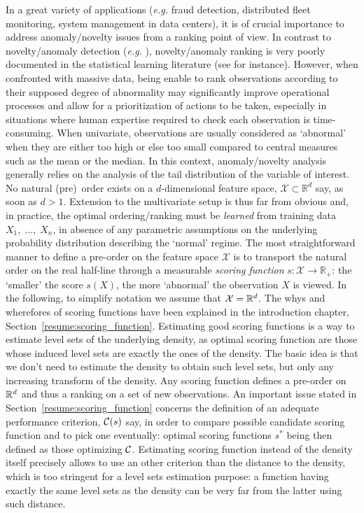 In a great variety of applications  (\textit{e.g.} fraud detection, distributed fleet monitoring, system management in data centers), it is of crucial importance to address anomaly/novelty issues from a ranking point of view. In contrast to novelty/anomaly detection (\textit{e.g.} \cite{Kolt97, VertVert, Scholkopf2001, SHS05}), novelty/anomaly ranking is very poorly documented in the statistical learning literature (see \cite{VCTWMS} for instance). However, when confronted with
massive data, being enable to rank observations according to their supposed
degree of abnormality may significantly improve operational processes and allow for a prioritization of actions to be taken, especially in situations where human expertise required to check each observation is time-consuming.
When univariate, observations are usually considered as `abnormal'
when they are either too high or else too small compared to central
measures such as the mean or the median. In this context, anomaly/novelty analysis generally relies
on the analysis of the tail distribution of the variable of interest.  No natural (pre)~order exists on a $d$-dimensional feature space,  $\mathcal{X} \subset\mathbb{R}^d$ say, as soon as $d>1$. Extension to the multivariate setup is thus far from obvious and, in practice, the optimal ordering/ranking must be \textit{learned} from training data $X_1,\; \ldots,\; X_n$, in absence of any parametric assumptions on the underlying probability distribution describing the `normal' regime. The most straightforward manner to define a pre-order on the feature space $\mathcal{X}$ is to transport the natural
order on the real half-line through a measurable \textit{scoring
  function} $s:\mathcal{X} \rightarrow \mathbb{R}_+$: the
`smaller' the score $s(X)$, the more `abnormal' the observation $X$ is
viewed. In the following, to simplify notation we assume that $\mathcal{X} = \mathbb{R}^d$.
%
The whys and wherefores of scoring functions have been explained in the introduction chapter, Section~\ref{resume:scoring_function}. Estimating good scoring functions is a way to estimate level sets of the underlying density, as optimal scoring function are those whose induced level sets are exactly the ones of the density. The basic idea is that we don't need to estimate the density to obtain such level sets, but only any increasing transform of the density.
%
Any scoring function defines a pre-order on $\mathbb{R}^d$ and thus a ranking on a set of new observations. An important issue stated in Section~\ref{resume:scoring_function} concerns the definition of an adequate performance criterion, $\mathcal{C}(s)$ say, in order to compare possible candidate scoring function and to pick one eventually: optimal scoring functions $s^*$ being then defined as those optimizing $\mathcal{C}$. 
Estimating scoring function instead of the density itself precisely allows to use an other criterion than the distance to the density, which is too stringent for a level sets estimation purpose: a function having exactly the same level sets as the density can be very far from the latter using such distance.

